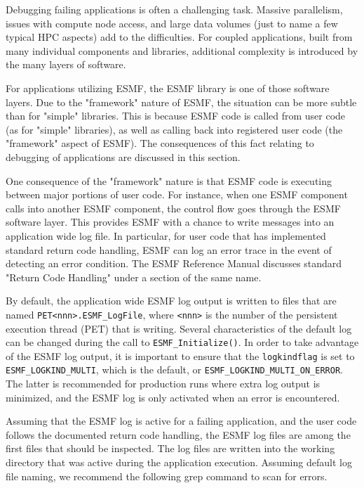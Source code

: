 
Debugging failing applications is often a challenging task. Massive
parallelism, issues with compute node access, and large data volumes (just to
name a few typical HPC aspects) add to the difficulties. For coupled
applications, built from many individual components and libraries, additional
complexity is introduced by the many layers of software.

For applications utilizing ESMF, the ESMF library is one of those software
layers. Due to the "framework" nature of ESMF, the situation can be
more subtle than for "simple" libraries. This is because ESMF code
is called from user code (as for "simple" libraries), as well as calling
back into registered user code (the "framework" aspect of ESMF). The
consequences of this fact relating to debugging of applications are discussed
in this section.

One consequence of the "framework" nature is that ESMF code is executing between
major portions of user code. For instance, when one ESMF component calls into
another ESMF component, the control flow goes through the ESMF software layer.
This provides ESMF with a chance to write messages into an application wide
log file. In particular, for user code that has implemented standard return
code handling, ESMF can log an error trace in the event of detecting an
error condition. The ESMF Reference Manual discusses standard "Return Code
Handling" under a section of the same name.

By default, the application wide ESMF log output is written to files that are
named {\tt PET<nnn>.ESMF\_LogFile}, where {\tt <nnn>} is the number of the
persistent execution thread (PET) that is writing. Several characteristics of
the default log can be changed during the call to {\tt ESMF\_Initialize()}. In
order to take advantage of the ESMF log output, it is important
to ensure that the {\tt logkindflag} is set to {\tt ESMF\_LOGKIND\_MULTI}, which
is the default, or {\tt ESMF\_LOGKIND\_MULTI\_ON\_ERROR}. The latter is
recommended for production runs where extra log output is minimized, and the ESMF
log is only activated when an error is encountered.

Assuming that the ESMF log is active for a failing application, and the user
code follows the documented return code handling, the ESMF log files are among
the first files that should be inspected. The log files are written into the
working directory that was active during the application execution. Assuming
default log file naming, we recommend the following grep command to scan for
errors.

